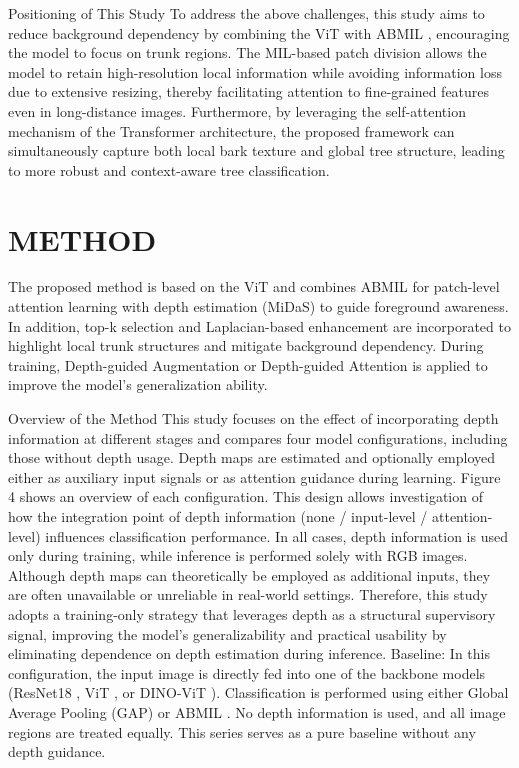 \documentclass{article}
\begin{document}
Positioning of This Study
To address the above challenges, this study aims to reduce background dependency by combining the ViT \cite{ref1} with ABMIL \cite{ref2}, encouraging the model to focus on trunk regions. The MIL-based patch division allows the model to retain high-resolution local information while avoiding information loss due to extensive resizing, thereby facilitating attention to fine-grained features even in long-distance images. Furthermore, by leveraging the self-attention mechanism of the Transformer architecture, the proposed framework can simultaneously capture both local bark texture and global tree structure, leading to more robust and context-aware tree classification.

\section{METHOD}
The proposed method is based on the ViT \cite{ref1} and combines ABMIL \cite{ref2} for patch-level attention learning with depth estimation (MiDaS) \cite{ref3} to guide foreground awareness. In addition, top-k selection and Laplacian-based enhancement are incorporated to highlight local trunk structures and mitigate background dependency. During training, Depth-guided Augmentation or Depth-guided Attention is applied to improve the model’s generalization ability.

Overview of the Method
This study focuses on the effect of incorporating depth information at different stages and compares four model configurations, including those without depth usage. Depth maps are estimated and optionally employed either as auxiliary input signals or as attention guidance during learning. Figure 4 shows an overview of each configuration. This design allows investigation of how the integration point of depth information (none / input-level / attention-level) influences classification performance. In all cases, depth information is used only during training, while inference is performed solely with RGB images. Although depth maps can theoretically be employed as additional inputs, they are often unavailable or unreliable in real-world settings. Therefore, this study adopts a training-only strategy that leverages depth as a structural supervisory signal, improving the model’s generalizability and practical usability by eliminating dependence on depth estimation during inference.
	Baseline:
In this configuration, the input image is directly fed into one of the backbone models (ResNet18 \cite{ref12}, ViT \cite{ref1}, or DINO-ViT \cite{ref13}). Classification is performed using either Global Average Pooling (GAP) or ABMIL \cite{ref2}. No depth information is used, and all image regions are treated equally. This series serves as a pure baseline without any depth guidance.
\end{document}
